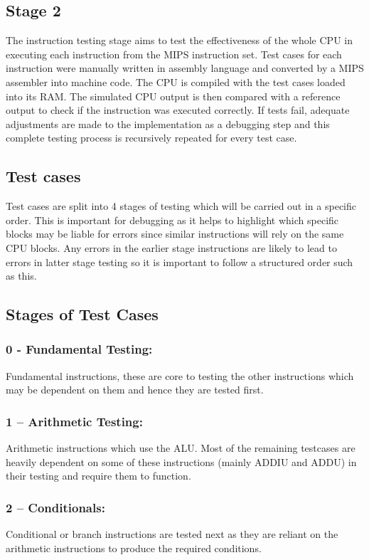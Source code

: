 \documentclass{article}
\begin{document}
\subsection{Stage 2}

The instruction testing stage aims to test the effectiveness of the whole CPU in executing each instruction from the MIPS instruction set. Test cases for each instruction were manually written in assembly language and converted by a MIPS assembler into machine code. The CPU is compiled with the test cases loaded into its RAM. The simulated CPU output is then compared with a reference output to check if the instruction was executed correctly. If tests fail, adequate adjustments are made to the implementation as a debugging step and this complete testing process is recursively repeated for every test case. 

\subsection{Test cases}
Test cases are split into 4 stages of testing which will be carried out in a specific order. This is important for debugging as it helps to highlight which specific blocks may be liable for errors since similar instructions will rely on the same CPU blocks. Any errors in the earlier stage instructions are likely to lead to errors in latter stage testing so it is important to follow a structured order such as this. 

\subsection{Stages of Test Cases}

\subsubsection{0 - Fundamental Testing:}
Fundamental instructions, these are core to testing the other instructions which may be dependent on them and hence they are tested first.

\subsubsection{1 – Arithmetic Testing:}
Arithmetic instructions which use the ALU. Most of the remaining testcases are heavily dependent on some of these instructions (mainly ADDIU and ADDU) in their testing and require them to function.

\subsubsection{2 – Conditionals:}
Conditional or branch instructions are tested next as they are reliant on the arithmetic instructions to produce the required conditions.
\end{document}
